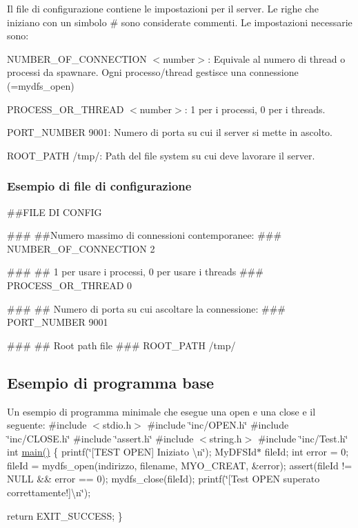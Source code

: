 Il file di configurazione contiene le impostazioni per il server. Le righe che iniziano con un simbolo {\ttfamily \#} sono considerate commenti. Le impostazioni necessarie sono\+:


\begin{DoxyItemize}
\item {\ttfamily N\+U\+M\+B\+E\+R\+\_\+\+O\+F\+\_\+\+C\+O\+N\+N\+E\+C\+T\+I\+ON $<$number$>$}\+: Equivale al numero di thread o processi da spawnare. Ogni processo/thread gestisce una connessione (=mydfs\+\_\+open)
\item {\ttfamily P\+R\+O\+C\+E\+S\+S\+\_\+\+O\+R\+\_\+\+T\+H\+R\+E\+AD $<$number$>$}\+: 1 per i processi, 0 per i threads.
\item {\ttfamily P\+O\+R\+T\+\_\+\+N\+U\+M\+B\+ER 9001}\+: Numero di porta su cui il server si mette in ascolto.
\item {\ttfamily R\+O\+O\+T\+\_\+\+P\+A\+TH /tmp/}\+: Path del file system su cui deve lavorare il server.
\end{DoxyItemize}

\subsubsection*{Esempio di file di configurazione}

\begin{DoxyVerb}##FILE DI CONFIG

###
##Numero massimo di connessioni contemporanee:
###
NUMBER_OF_CONNECTION 2

###
## 1 per usare i processi, 0 per usare i threads
###
PROCESS_OR_THREAD 0

###
## Numero di porta su cui ascoltare la connessione:
###
PORT_NUMBER 9001

###
## Root path file
###
ROOT_PATH /tmp/
\end{DoxyVerb}


\subsection*{Esempio di programma base}

Un esempio di programma minimale che esegue una open e una close e\textquotesingle{} il seguente\+: \#include $<$stdio.\+h$>$ \#include \char`\"{}inc/\+O\+P\+E\+N.\+h\char`\"{} \#include \char`\"{}inc/\+C\+L\+O\+S\+E.\+h\char`\"{} \#include \char`\"{}assert.\+h\char`\"{} \#include $<$string.\+h$>$ \#include \char`\"{}inc/\+Test.\+h\char`\"{} int \hyperlink{testBinario_8c_ae66f6b31b5ad750f1fe042a706a4e3d4}{main()} \{ printf(\char`\"{}\mbox{[}\+T\+E\+S\+T O\+P\+E\+N\mbox{]} Iniziato \textbackslash{}n\char`\"{}); My\+D\+F\+S\+Id$\ast$ file\+Id; int error = 0; file\+Id = mydfs\+\_\+open(indirizzo, filename, M\+Y\+O\+\_\+\+C\+R\+E\+A\+T, \&error); assert(file\+Id != N\+U\+LL \&\& error == 0); mydfs\+\_\+close(file\+Id); printf(\char`\"{}\mbox{[}\+Test O\+P\+E\+N superato correttamente!\mbox{]}\textbackslash{}n\char`\"{});

return E\+X\+I\+T\+\_\+\+S\+U\+C\+C\+E\+SS; \} 